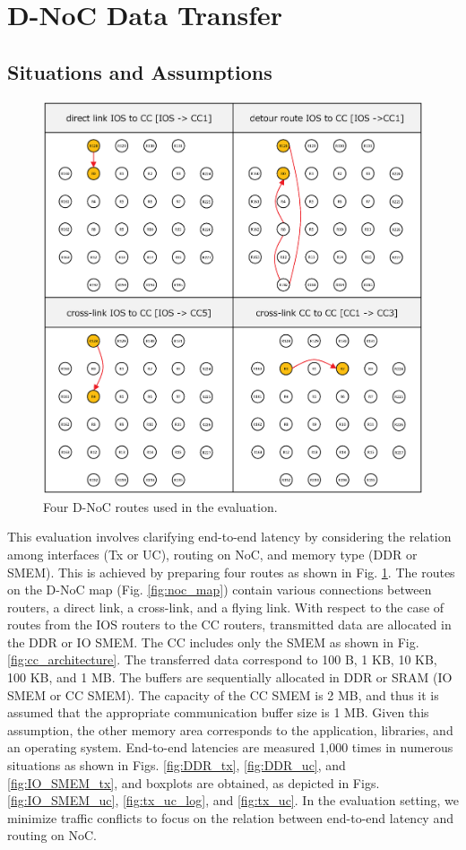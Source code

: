 \section{D-NoC Data Transfer}
\label{sec:dnoc_eval}

\subsection{Situations and Assumptions}
\label{sec:situations_and_assumptions2}

\begin{figure}[!htbp]
  \centering
  \includegraphics[width=0.5\linewidth]{../figure/noc_routes_old.eps}
      \caption{\label{fig:noc_routes}
    Four D-NoC routes used in the evaluation.}
\end{figure}

This evaluation involves clarifying end-to-end latency by considering the relation among interfaces (Tx or UC), routing on NoC, and memory type (DDR or SMEM).
This is achieved by preparing four routes as shown in Fig. \ref{fig:noc_routes}.
The routes on the D-NoC map (Fig. \ref{fig:noc_map}) contain various connections between routers, a direct link, a cross-link, and a flying link.
With respect to the case of routes from the IOS routers to the CC routers, transmitted data are allocated in the DDR or IO SMEM.
The CC includes only the SMEM as shown in Fig. \ref{fig:cc_architecture}.
The transferred data correspond to 100 B, 1 KB, 10 KB, 100 KB, and 1 MB.
The buffers are sequentially allocated in DDR or SRAM (IO SMEM or CC SMEM).
The capacity of the CC SMEM is 2 MB, and thus it is assumed that the appropriate communication buffer size is 1 MB.
Given this assumption, the other memory area corresponds to the application, libraries, and an operating system.
End-to-end latencies are measured 1,000 times in numerous situations as shown in Figs. \ref{fig:DDR_tx}, \ref{fig:DDR_uc}, and \ref{fig:IO_SMEM_tx}, and boxplots are obtained, as depicted in Figs. \ref{fig:IO_SMEM_uc}, \ref{fig:tx_uc_log}, and \ref{fig:tx_uc}.
In the evaluation setting, we minimize traffic conflicts to focus on the relation between end-to-end latency and routing on NoC.


